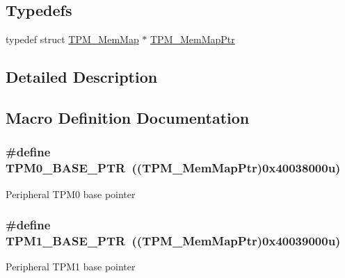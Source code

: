 \subsection*{Typedefs}
\begin{DoxyCompactItemize}
\item 
typedef struct \hyperlink{struct_t_p_m___mem_map}{T\+P\+M\+\_\+\+Mem\+Map} $\ast$ \hyperlink{group___t_p_m___peripheral_ga32147338cedc9904efff0d19b3a358ac}{T\+P\+M\+\_\+\+Mem\+Map\+Ptr}
\end{DoxyCompactItemize}


\subsection{Detailed Description}


\subsection{Macro Definition Documentation}
\hypertarget{group___t_p_m___peripheral_ga8ba6c6fb69345639750108c3289a24c4}{}
\subsubsection[{T\+P\+M0\+\_\+\+B\+A\+S\+E\+\_\+\+P\+T\+R}]{\setlength{\rightskip}{0pt plus 5cm}\#define T\+P\+M0\+\_\+\+B\+A\+S\+E\+\_\+\+P\+T\+R~(({\bf T\+P\+M\+\_\+\+Mem\+Map\+Ptr})0x40038000u)}\label{group___t_p_m___peripheral_ga8ba6c6fb69345639750108c3289a24c4}
Peripheral T\+P\+M0 base pointer \hypertarget{group___t_p_m___peripheral_ga3c3f533f8c87c74f2bbc3a4de83d1181}{}
\subsubsection[{T\+P\+M1\+\_\+\+B\+A\+S\+E\+\_\+\+P\+T\+R}]{\setlength{\rightskip}{0pt plus 5cm}\#define T\+P\+M1\+\_\+\+B\+A\+S\+E\+\_\+\+P\+T\+R~(({\bf T\+P\+M\+\_\+\+Mem\+Map\+Ptr})0x40039000u)}\label{group___t_p_m___peripheral_ga3c3f533f8c87c74f2bbc3a4de83d1181}
Peripheral T\+P\+M1 base pointer \hypertarget{group___t_p_m___peripheral_ga37cc120e7475fb646fe9bc15b57f06bc}{}

